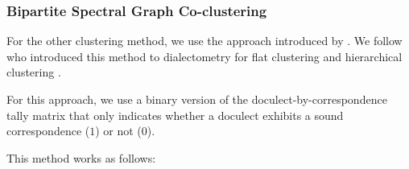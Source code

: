 \documentclass[a4paper]{article}
\begin{document}
\subsubsection{Bipartite Spectral Graph Co-clustering}
\label{subsubsec:bsgc}

For the other clustering method, we use the approach
introduced by \citet{dhillon2001co-clustering}.
We follow \citeauthor*{wieling2009bipartite} who introduced
this method to dialectometry for flat clustering \citeyearpar{wieling2009bipartite} and hierarchical clustering \citeyearpar{wieling2010hierarchical}.

For this approach, we use a binary version of the
doculect-by-correspondence tally matrix that only
indicates whether a doculect exhibits
a sound correspondence ($1$) or not ($0$).

This method works as follows:
\end{document}
